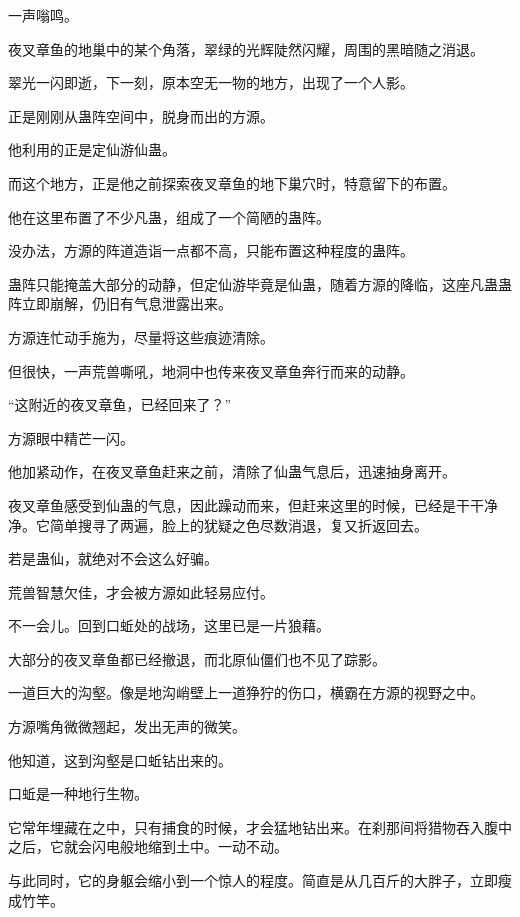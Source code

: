 
\begin{this_body}

一声嗡鸣。

夜叉章鱼的地巢中的某个角落，翠绿的光辉陡然闪耀，周围的黑暗随之消退。

翠光一闪即逝，下一刻，原本空无一物的地方，出现了一个人影。

正是刚刚从蛊阵空间中，脱身而出的方源。

他利用的正是定仙游仙蛊。

而这个地方，正是他之前探索夜叉章鱼的地下巢穴时，特意留下的布置。

他在这里布置了不少凡蛊，组成了一个简陋的蛊阵。

没办法，方源的阵道造诣一点都不高，只能布置这种程度的蛊阵。

蛊阵只能掩盖大部分的动静，但定仙游毕竟是仙蛊，随着方源的降临，这座凡蛊蛊阵立即崩解，仍旧有气息泄露出来。

方源连忙动手施为，尽量将这些痕迹清除。

但很快，一声荒兽嘶吼，地洞中也传来夜叉章鱼奔行而来的动静。

“这附近的夜叉章鱼，已经回来了？”

方源眼中精芒一闪。

他加紧动作，在夜叉章鱼赶来之前，清除了仙蛊气息后，迅速抽身离开。

夜叉章鱼感受到仙蛊的气息，因此躁动而来，但赶来这里的时候，已经是干干净净。它简单搜寻了两遍，脸上的犹疑之色尽数消退，复又折返回去。

若是蛊仙，就绝对不会这么好骗。

荒兽智慧欠佳，才会被方源如此轻易应付。

不一会儿。回到口蚯处的战场，这里已是一片狼藉。

大部分的夜叉章鱼都已经撤退，而北原仙僵们也不见了踪影。

一道巨大的沟壑。像是地沟峭壁上一道狰狞的伤口，横霸在方源的视野之中。

方源嘴角微微翘起，发出无声的微笑。

他知道，这到沟壑是口蚯钻出来的。

口蚯是一种地行生物。

它常年埋藏在之中，只有捕食的时候，才会猛地钻出来。在刹那间将猎物吞入腹中之后，它就会闪电般地缩到土中。一动不动。

与此同时，它的身躯会缩小到一个惊人的程度。简直是从几百斤的大胖子，立即瘦成竹竿。


\end{this_body}
